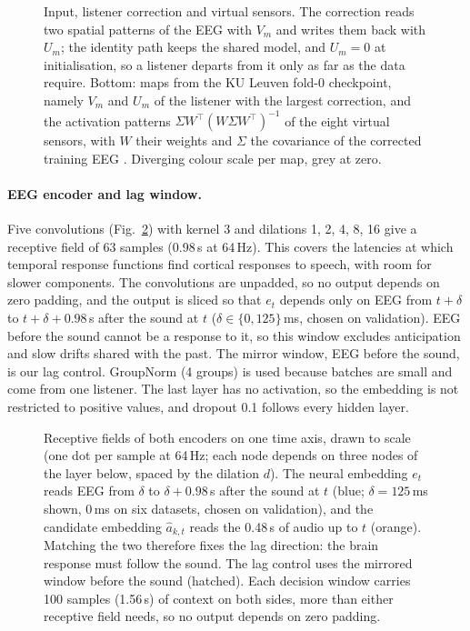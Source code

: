 \documentclass[twoside]{article}
\begin{document}
\begin{figure}[t]\centering
\resizebox{\textwidth}{!}{}
\caption{Input, listener correction and virtual sensors. The correction reads two spatial
patterns of the EEG with $V_m$ and writes them back with $U_m$; the identity path
keeps the shared model, and $U_m=0$ at initialisation, so a listener departs from it only
as far as the data require. Bottom: maps from the KU Leuven fold-0 checkpoint, namely
$V_m$ and $U_m$ of the listener with the largest correction, and the activation
patterns $\Sigma W^{\top}(W\Sigma W^{\top})^{-1}$ of the eight virtual sensors, with $W$ their
weights and $\Sigma$ the covariance
of the corrected training EEG \citep{haufe2014interpretation}. Diverging colour scale per
map, grey at zero.}\label{fig:net_input}
\end{figure}

\paragraph{EEG encoder and lag window.} Five convolutions (Fig.~\ref{fig:net_enc}) with kernel 3 and dilations
1, 2, 4, 8, 16 give a receptive field of 63 samples (0.98\,s at 64\,Hz). This covers the
latencies at which temporal response functions find cortical responses to speech, with
room for slower components. The
convolutions are unpadded, so no output depends on zero padding, and the output is sliced
so that $e_t$ depends only on EEG from $t+\delta$ to $t+\delta+0.98$\,s after the
sound at $t$ ($\delta\in\{0,125\}$\,ms, chosen on validation). EEG before the sound cannot
be a response to it, so this window excludes anticipation and slow drifts shared with the
past. The mirror window, EEG before the sound, is our lag control. GroupNorm (4 groups)
is used because batches are small and come from one listener. The last layer has no
activation, so the embedding is not restricted to positive values, and dropout 0.1
follows every hidden layer.

\begin{figure}[t]\centering
\resizebox{0.95\textwidth}{!}{}
\caption{Receptive fields of both encoders on one time axis, drawn to scale (one dot per
sample at 64\,Hz; each node depends on three nodes of the layer below, spaced by the
dilation $d$). The neural embedding $e_t$ reads EEG from $\delta$ to
$\delta+0.98$\,s after the sound at $t$ (blue; $\delta=125$\,ms shown, 0\,ms on six
datasets, chosen on validation), and the candidate embedding $\hat a_{k,t}$ reads the
0.48\,s of audio up to $t$ (orange). Matching the two therefore fixes the lag direction:
the brain response must follow the sound. The lag control uses the mirrored window before
the sound (hatched). Each decision window carries 100 samples (1.56\,s) of context on both
sides, more than either receptive field needs, so no output depends on zero
padding.}\label{fig:net_enc}
\end{figure}
\end{document}
